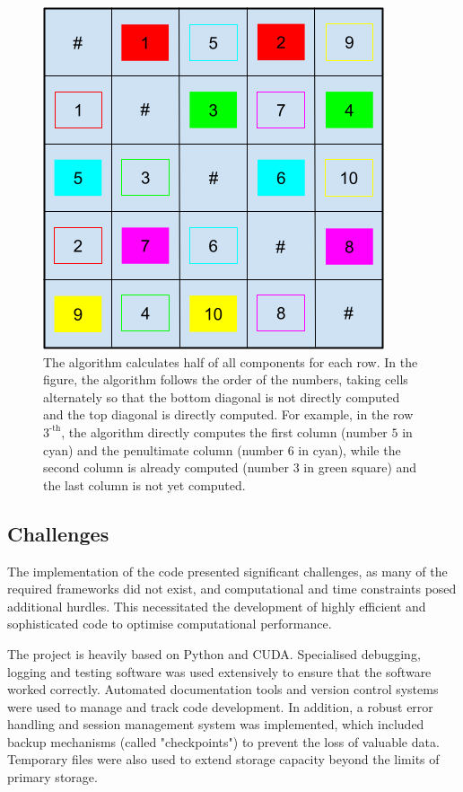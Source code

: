\begin{toReview}
	\begin{figure}[H]
		\centering
		\includegraphics[width=0.7\linewidth]{Figures/analysis_sort.png}
		\caption[Visit all pairs combinations of a list]{The algorithm calculates half of all components for each row. In the figure, the algorithm follows the order of the numbers, taking cells alternately so that the bottom diagonal is not directly computed and the top diagonal is directly computed. For example, in the row $3^\text{-th}$, the algorithm directly computes the first column (number $5$ in cyan) and the penultimate column (number $6$ in cyan), while the second column is already computed (number $3$ in green square) and the last column is not yet computed.}
		\label{fig:distance_computation}
	\end{figure}

	\subsection{Challenges} The implementation of the code presented significant challenges, as many of the required frameworks did not exist, and computational and time constraints posed additional hurdles. This necessitated the development of highly efficient and sophisticated code to optimise computational performance.

	\noindent The project is heavily based on \gls{Python} and \gls{CUDA}. Specialised debugging, logging and testing software was used extensively to ensure that the software worked correctly. Automated documentation tools and version control systems were used to manage and track code development. In addition, a robust error handling and session management system was implemented, which included backup mechanisms (called "checkpoints") to prevent the loss of valuable data. Temporary files were also used to extend storage capacity beyond the limits of primary storage.


\end{toReview}
